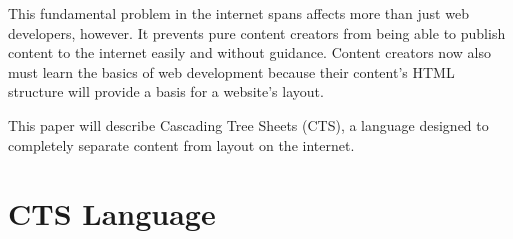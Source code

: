 \documentclass[12pt]{article}
\begin{document}
This fundamental problem in the internet spans affects more than just web developers, however. It prevents pure content creators from being able to publish content to the internet easily and without guidance. Content creators now also must learn the basics of web development because their content's HTML structure will provide a basis for a website's layout.

This paper will describe Cascading Tree Sheets (CTS), a language designed to completely separate content from layout on the internet.

\section{CTS Language}
\end{document}
